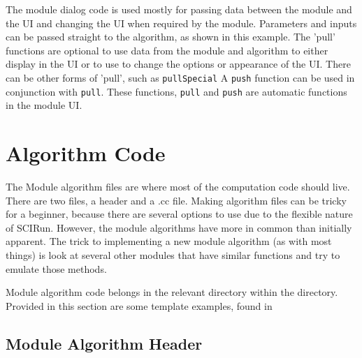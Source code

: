\documentclass[fleqn,11pt,openany]{book}
\begin{document}
The module dialog code is used mostly for passing data between the module and the UI and changing the UI when required by the module.  
Parameters and inputs can be passed straight to the algorithm, as shown in this example.  
The 'pull' functions are optional to use data from the module and algorithm to either display in the UI or to use to change the options or appearance of the UI.  
There can be other forms of 'pull', such as \verb|pullSpecial|
A \verb|push| function can be used in conjunction with \verb|pull|.
These functions, \verb|pull| and \verb|push| are automatic functions in the module UI.

\section{Algorithm Code}
\label{sec:algo}

The Module algorithm files are where most of the computation code should live.  
There are two files, a header and a .cc file. 
Making algorithm files can be tricky for a beginner, because there are several options to use due to the flexible nature of SCIRun.  
However, the module algorithms have more in common than initially apparent.
The trick to implementing a new module algorithm (as with most things) is look at several other modules that have similar functions and try to emulate those methods.  

Module algorithm code belongs in the relevant directory within the \emph{} directory.
Provided in this section are some template examples, found in \emph{}

\subsection{Module Algorithm Header}
\end{document}
